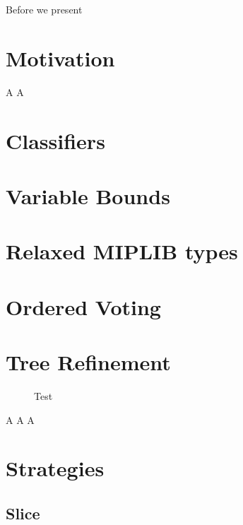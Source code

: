 	Before we present 
	
	\clearpage
	
	\section{Motivation}
	
		A\clearpage
		A\clearpage
	
	\section{Classifiers}
	
		\section{Variable Bounds}
			
			\clearpage
		
		\section{Relaxed MIPLIB types}
		
			\clearpage
			
		\section{Ordered Voting}
		
			\clearpage

	\section{Tree Refinement}
	
		\begin{figure}[ht!]
			\centering
			
			\caption{Test}
			\label{fig:tree:binpackNOP}
		\end{figure}
	
		\clearpage
		A\clearpage
		A\clearpage
		A\clearpage
		
	\section{Strategies}
	
		\subsection{Slice}
			\clearpage
		
